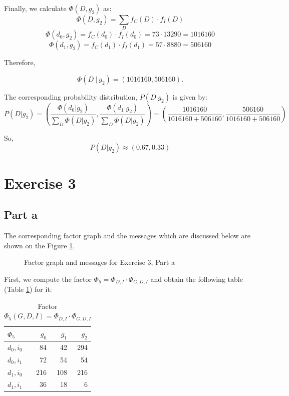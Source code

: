 \documentclass[11pt,a4paper]{article}
\begin{document}
	Finally, we calculate $ \Phi(D, g_2) $ as:
	$$\Phi(D,  g_2) = \sum_{D}f_C(D) \cdot f_I(D)$$
	$$\Phi(d_0, g_2) = f_C(d_0) \cdot f_I(d_0) = 73 \cdot 13290 = 1016160 $$
	$$\Phi(d_1, g_2) = f_C(d_1) \cdot f_I(d_1) = 57 \cdot 8880 = 506160 $$
	
	Therefore,
	
	$$ \Phi(D \ | \ g_2) = (1016160, 506160). $$
	
	The corresponding probability distribution, $P(D | g_2)$ is given by:
	$$ P(D | g_2) = \left(\frac{\Phi(d_0 | g_2)}{\sum_{D}\Phi(D | g_2)}, \frac{\Phi(d_1 | g_2)}{\sum_{D}\Phi(D | g_2)}\right) = \left(\frac{1016160}{1016160+506160},\frac{506160}{1016160+506160}\right) $$
	
	So,
	$$ P(D | g_2) \approx (0.67,0.33) $$
	
\section*{Exercise 3}

\subsection*{Part a}

The corresponding factor graph and the messages which are discussed below are shown on the Figure \ref{fig:fgraph_3a}.

\begin{figure}[H]
	\caption{Factor graph and messages for Exercise 3, Part a}
	\label{fig:fgraph_3a}
\end{figure}

First, we compute the factor $\Phi_5 = \Phi_{D, I} \cdot \Phi_{G, D, I}$ and obtain the following table (Table \ref{tab:f5}) for it:

\begin{table}[H]
	\centering
	\begin{tabular}{l|rrr}
		\toprule
		$\Phi_5$ & $g_0$ & $g_1$ & $g_2$ \\
		\midrule 
		$d_0, i_0$ & 84 & 42 & 294 \\
		$d_0, i_1$ & 72 & 54 & 54 \\
		$d_1, i_0$ & 216 & 108 & 216 \\
		$d_1, i_1$ & 36 & 18 & 6 \\
		\bottomrule
	\end{tabular}
	\caption{Factor $\Phi_5(G, D, I) =  \Phi_{D, I} \cdot \Phi_{G, D, I}$}
	\label{tab:f5}
\end{table}
	
\end{document}
